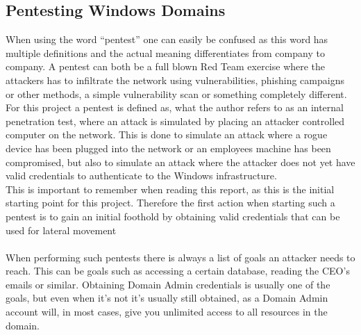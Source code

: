 \documentclass{article}
\begin{document}
\subsection{Pentesting Windows Domains}
When using the word \enquote{pentest} one can easily be confused as this word has multiple definitions and the actual meaning differentiates from company to company. A pentest can both be a full blown Red Team exercise where the attackers has to infiltrate the network using vulnerabilities, phishing campaigns or other methods, a simple vulnerability scan or something completely different. For this project a pentest is defined as, what the author refers to as an internal penetration test, where an attack is simulated by placing an attacker controlled computer on the network. This is done to simulate an attack where a rogue device has been plugged into the network or an employees machine has been compromised, but also to simulate an attack where the attacker does not yet have valid credentials to authenticate to the Windows infrastructure.
\\
This is important to remember when reading this report, as this is the initial starting point for this project. Therefore the first action when starting such a pentest is to gain an initial foothold by obtaining valid credentials that can be used for lateral movement
\\\\
When performing such pentests there is always a list of goals an attacker needs to reach. This can be goals such as accessing a certain database, reading the CEO's emails or similar. Obtaining Domain Admin credentials is usually one of the goals, but even when it's not it's usually still obtained, as a Domain Admin account will, in most cases, give you unlimited access to all resources in the domain.
\end{document}
